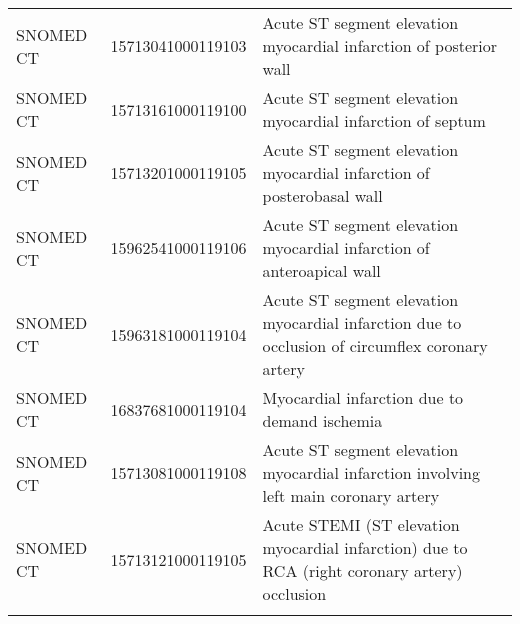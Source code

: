 \begin{longtable}{p{}p{}p{}}
  SNOMED CT & 15713041000119103 & Acute ST segment elevation myocardial infarction of posterior wall \\ 
  SNOMED CT & 15713161000119100 & Acute ST segment elevation myocardial infarction of septum \\ 
  SNOMED CT & 15713201000119105 & Acute ST segment elevation myocardial infarction of posterobasal wall \\ 
  SNOMED CT & 15962541000119106 & Acute ST segment elevation myocardial infarction of anteroapical wall \\ 
  SNOMED CT & 15963181000119104 & Acute ST segment elevation myocardial infarction due to occlusion of circumflex coronary artery \\ 
  SNOMED CT & 16837681000119104 & Myocardial infarction due to demand ischemia \\ 
  SNOMED CT & 15713081000119108 & Acute ST segment elevation myocardial infarction involving left main coronary artery \\ 
  SNOMED CT & 15713121000119105 & Acute STEMI (ST elevation myocardial infarction) due to RCA (right coronary artery) occlusion \\ 
  \hline
\label{tab:codes_myocardial-infarction}
\end{longtable}

